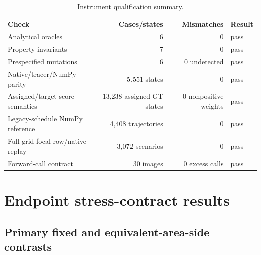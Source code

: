 \documentclass[preprint,10pt]{elsarticle}
\begin{document}
\begin{table}[ht]
\centering
\caption{Instrument qualification summary.}
\begin{tabular}{@{}lrrl@{}}
\toprule
Check & Cases/states & Mismatches & Result \\
\midrule
Analytical oracles & 6 & 0 & pass \\
Property invariants & 7 & 0 & pass \\
Prespecified mutations & 6 & 0 undetected & pass \\
Native/tracer/NumPy parity & 5,551 states & 0 & pass \\
Assigned/target-score semantics & 13,238 assigned GT states & 0 nonpositive weights & pass \\
Legacy-schedule NumPy reference & 4,408 trajectories & 0 & pass \\
Full-grid focal-row/native replay & 3,072 scenarios & 0 & pass \\
Forward-call contract & 30 images & 0 excess calls & pass \\
\bottomrule
\end{tabular}
\end{table}

\begin{table}[p]
\centering
\caption{Executable analytical-oracle, metamorphic-property, and mutation-test detail. These checks qualify the measurement instrument and its governance; they are not scientific outcome evidence. Case names and outcomes are transcribed from the frozen qualification artifacts.}

\end{table}
\FloatBarrier

\section{Endpoint stress-contract results}

\subsection{Primary fixed and equivalent-area-side contrasts}

\begin{table}[ht]
\centering
\caption{AI-TOD-v2 primary fragility rates and scale contrasts in percentage points. Gaps are 8--16 minus 16--32 px; the paired gap is O2O minus O2M. Brackets are 95\% stratified image-cluster bootstrap intervals.}
\resizebox{\textwidth}{!}{%

}
\end{table}
\end{document}
